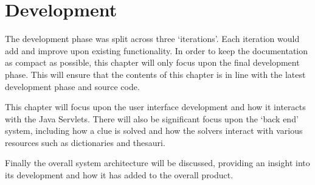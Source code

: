 \chapter{Development}
\label{cha:development}

The development phase was split across three `iterations'. Each iteration would
add and improve upon existing functionality. In order to keep the documentation
as compact as possible, this chapter will only focus upon the final development 
phase. This will ensure that the contents of this chapter is in line with the 
latest development phase and source code.

This chapter will focus upon the user interface development and how it interacts
with the Java Servlets. There will also be significant focus upon the `back 
end' system, including how a clue is solved and how the solvers interact with 
various resources such as dictionaries and thesauri. 

Finally the overall system architecture will be discussed, providing an insight 
into its development and how it has added to the overall product.

\newpage


\newpage


\newpage


\newpage


\newpage


\newpage


\newpage

